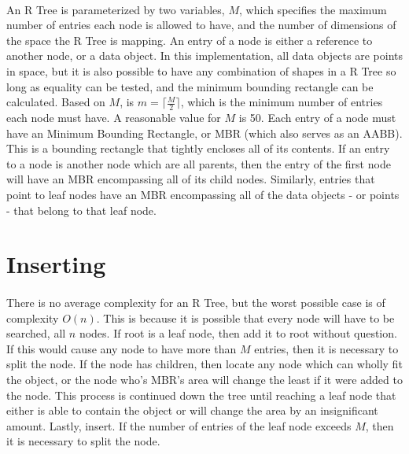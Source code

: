 \documentclass{article}
\begin{document}
\begin{multicols}{2}[]
\paragraph{}
An R Tree is parameterized by two variables, $M$, which specifies the maximum number of entries each node is allowed to have, and
 the number of dimensions of the space the R Tree is mapping. An entry of a node is either a reference
to another node, or a data object. In this implementation, all data objects are points in space, but it is also possible to have any combination
 of shapes in a R Tree so long as equality can be tested, and the minimum bounding rectangle can be calculated.
Based on $M$, is $m = \lceil\frac{M}{2}\rceil$, which is the minimum number of entries each node must have. A reasonable value for $M$ is 50.
 \cite{guttman_1984_rtrees} Each entry of a node must have an Minimum Bounding Rectangle,
or MBR (which also serves as an AABB). This is a bounding rectangle that tightly encloses all of its contents. If an entry to a node is another node
which are all parents, then the entry of the first node will have an MBR encompassing all of its child nodes.
Similarly, entries that point to leaf nodes have an MBR encompassing all of the data objects - or points - that belong to that leaf node.

\section{Inserting}
\paragraph{}
There is no average complexity for an R Tree, but the worst possible
case is of complexity $O(n)$. This is because it is possible that every node will have to be searched, all $n$ nodes. If root is a leaf node, then add it to root without question. If this would cause any node to have
 more than $M$ entries, then it is necessary to split the node. If the node has children, then locate any node which can wholly
fit the object, or the node who's MBR's area will change the least if it were added to the node.  This process is continued down the tree until reaching a leaf node that either is able to contain the object or will change the area by an insignificant amount. Lastly, insert. If the number of entries of the leaf node exceeds $M$, then it is necessary to split the node.


\end{multicols}
\end{document}
